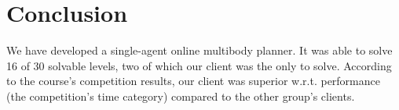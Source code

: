 \section{Conclusion}
\label{sec:conclusion}

We have developed a single-agent online multibody planner.
It was able to solve 16 of 30 solvable levels, two of which our client was the only to solve.
According to the course's competition results, our client was superior w.r.t. performance (the competition's time category) compared to the other group's clients.


